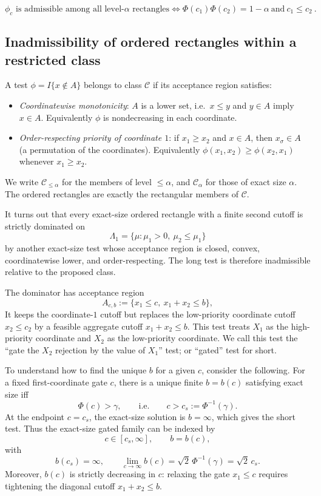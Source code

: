 \documentclass[12pt]{article}
\theoremstyle{definition}
\theoremstyle{remark}
\begin{document}
\[
\boxed{
\phi_c\text{ is admissible among all level-}\alpha\text{ rectangles}
\iff
\Phi(c_1)\Phi(c_2)=1-\alpha
\ \text{and}\
c_1\le c_2~.
}
\]

\subsection*{Inadmissibility of ordered rectangles within a restricted class}

A test $\phi=I\{x\notin A\}$ belongs to class $\mathcal C$ if its acceptance region satisfies:
\begin{itemize}[leftmargin=2.2em]
\item[\textbf{(M1)}] \emph{Coordinatewise monotonicity}: $A$ is a lower set, i.e.\ $x\le y$ and $y\in A$ imply $x\in A$. Equivalently $\phi$ is nondecreasing in each coordinate.
\item[\textbf{(M2)}] \emph{Order-respecting priority of coordinate $1$}: if $x_1\ge x_2$ and $x\in A$, then $ x_{\sigma}\in A$ (a permutation of the coordinates). Equivalently $\phi(x_1,x_2)\ge\phi(x_2,x_1)$ whenever $x_1\ge x_2$.
\end{itemize}
We write $\mathcal C_{\le\alpha}$ for the members of level $\le\alpha$, and $\mathcal C_{\alpha}$ for those of exact size $\alpha$. The ordered rectangles are exactly the rectangular members of $\mathcal C$.

It turns out that every exact-size ordered rectangle with a finite second cutoff is strictly dominated on
\[
\Lambda_1=\{\mu:\mu_1>0,\ \mu_2\le\mu_1\}
\]
by another exact-size test whose acceptance region is closed, convex, coordinatewise lower, and order-respecting.  The long test is therefore inadmissible relative to the proposed class.

The dominator has acceptance region
\[
    A_{c,b}:=\{x_1\le c,\ x_1+x_2\le b\},
\]
It keeps the coordinate-$1$ cutoff but replaces the low-priority coordinate cutoff $x_2\le c_2$ by a feasible aggregate cutoff $x_1+x_2\le b$. This test treats $X_1$ as the high-priority coordinate and $X_2$ as the low-priority coordinate. We call this test the ``gate the $X_2$ rejection by the value of $X_1$'' test; or ``gated'' test for short. 

To understand how to find the unique $b$ for a given $c$, consider the following. For a fixed first-coordinate gate \(c\), there is a unique finite \(b=b(c)\)
satisfying exact size iff
\[
\Phi(c)>\gamma,
\qquad\text{i.e.}\qquad
c>c_s:=\Phi^{-1}(\gamma).
\]
At the endpoint \(c=c_s\), the exact-size solution is \(b=\infty\), which gives
the short test. Thus the exact-size gated family can be indexed by
\[
c\in[c_s,\infty],
\qquad
b=b(c),
\]
with
\[
b(c_s)=\infty,
\qquad
\lim_{c\to\infty} b(c)=\sqrt 2\,\Phi^{-1}(\gamma)=\sqrt 2\,c_s .
\]
Moreover, \(b(c)\) is strictly decreasing in \(c\): relaxing the gate \(x_1\le c\)
requires tightening the diagonal cutoff \(x_1+x_2\le b\).
\end{document}
